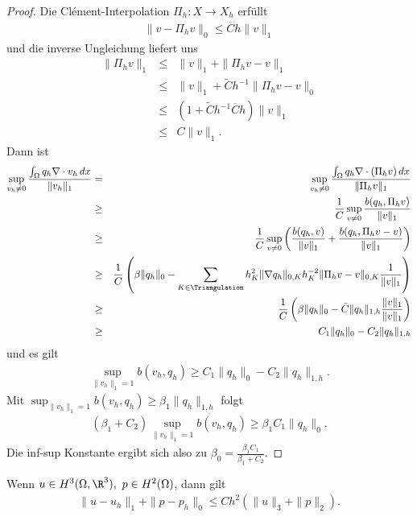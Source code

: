 \begin{proof}
    Die Cl\'ement-Interpolation $\Pi_h: X \to X_h$ erfüllt
    \begin{eqnarray*}
            \|v - \Pi_h v\|_0
        \le \overline C h \|v\|_1
    \end{eqnarray*}
    und die inverse Ungleichung liefert uns
    \begin{eqnarray*}
              \|\Pi_h v\|_1
        &\le& \|v\|_1 + \|\Pi_h v - v\|_1 \\
        &\le& \|v\|_1 + \tilde C h^{-1} \|\Pi_h v - v\|_0 \\
        &\le& (1 + \tilde C h^{-1} \overline C h) \|v\|_1 \\
        &\le& C \|v\|_1.
    \end{eqnarray*}
    Dann ist
    \begin{eqnarray*}
            \sup_{v_h \neq 0} \frac{\int_\Omega q_h \nabla \cdot v_h \,dx}
            {\|v_h\|_1}
        &=& \sup_{v_h \neq 0} \frac{\int_\Omega q_h \nabla \cdot (\Pi_h v) \,dx}
            {\|\Pi_h v\|_1} \\
        &\ge& \frac{1}{C} \sup_{v \neq 0} \frac{b(q_h, \Pi_h v)}{\|v\|_1} \\
        &\ge& \frac{1}{C} \sup_{v \neq 0} \left(\frac{b(q_h, v)}{\|v\|_1} +
              \frac{b(q_h, \Pi_h v - v)}{\|v\|_1}\right) \\
        &\ge& \frac{1}{C} \left(\beta \|q_h\|_0 - \sum_{K\in \Triangulation}
              h_K^2 \|\nabla q_h\|_{0,K} h_K^{-2} \|\Pi_h v - v\|_{0,K}
              \frac{1}{\|v\|_1}\right) \\
        &\ge& \frac{1}{C} \left(\beta \|q_h\|_0 - \tilde C \|q_h\|_{1,h}
              \frac{\|v\|_1}{\|v\|_1}\right) \\
        &\ge& C_1 \|q_h\|_0 - C_2 \|q_h\|_{1,h}
    \end{eqnarray*}
    und es gilt
    \begin{eqnarray*}
            \sup_{\|v_h\|_1 = 1} b(v_h, q_h)
        \ge C_1 \|q_h\|_0 - C_2 \|q_h\|_{1,h}.
    \end{eqnarray*}
    Mit $\sup_{\|v_h\|_1 = 1} b(v_h, q_h) \ge \beta_1 \|q_h\|_{1,h}$ folgt
    \begin{eqnarray*}
        (\beta_1 + C_2) \sup_{\|v_h\|_1 = 1} b(v_h, q_h)
        \ge \beta_1 C_1 \|q_h\|_0.
    \end{eqnarray*}
    Die inf-sup Konstante ergibt sich also zu $\beta_0 = \frac{\beta_1 C_1}
    {\beta_1 + C_2}$.
\end{proof}


\begin{Folgerung}
    \label{folgerung:5.21}
    Wenn $u\in H^3(\Omega, \R^3), \ p\in H^2(\Omega)$, dann gilt
    \begin{eqnarray*}
        \|u - u_h\|_1 + \|p - p_h\|_0 \le C h^2 (\|u\|_3 + \|p\|_2).
    \end{eqnarray*}
\end{Folgerung}
